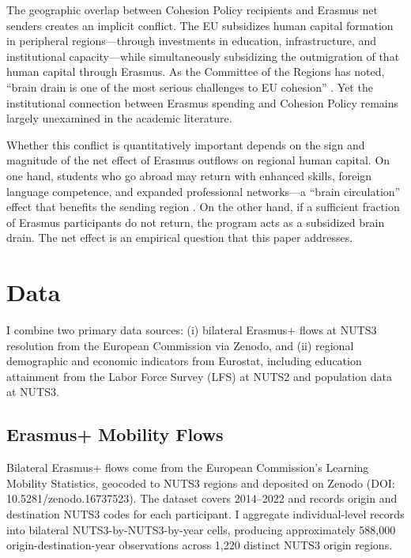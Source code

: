 \documentclass[12pt]{article}
\begin{document}
The geographic overlap between Cohesion Policy recipients and Erasmus net senders creates an implicit conflict. The EU subsidizes human capital formation in peripheral regions---through investments in education, infrastructure, and institutional capacity---while simultaneously subsidizing the outmigration of that human capital through Erasmus. As the Committee of the Regions has noted, ``brain drain is one of the most serious challenges to EU cohesion'' \citep{ec_cor_2020}. Yet the institutional connection between Erasmus spending and Cohesion Policy remains largely unexamined in the academic literature.

Whether this conflict is quantitatively important depends on the sign and magnitude of the net effect of Erasmus outflows on regional human capital. On one hand, students who go abroad may return with enhanced skills, foreign language competence, and expanded professional networks---a ``brain circulation'' effect that benefits the sending region \citep{beine_docquier_rapoport_2008}. On the other hand, if a sufficient fraction of Erasmus participants do not return, the program acts as a subsidized brain drain. The net effect is an empirical question that this paper addresses.


\section{Data}
\label{sec:data}

I combine two primary data sources: (i) bilateral Erasmus+ flows at NUTS3 resolution from the European Commission via Zenodo, and (ii) regional demographic and economic indicators from Eurostat, including education attainment from the Labor Force Survey (LFS) at NUTS2 and population data at NUTS3.

\subsection{Erasmus+ Mobility Flows}

Bilateral Erasmus+ flows come from the European Commission's Learning Mobility Statistics, geocoded to NUTS3 regions and deposited on Zenodo (DOI: 10.5281/zenodo.16737523). The dataset covers 2014--2022 and records origin and destination NUTS3 codes for each participant. I aggregate individual-level records into bilateral NUTS3-by-NUTS3-by-year cells, producing approximately 588,000 origin-destination-year observations across 1,220 distinct NUTS3 origin regions.
\end{document}
